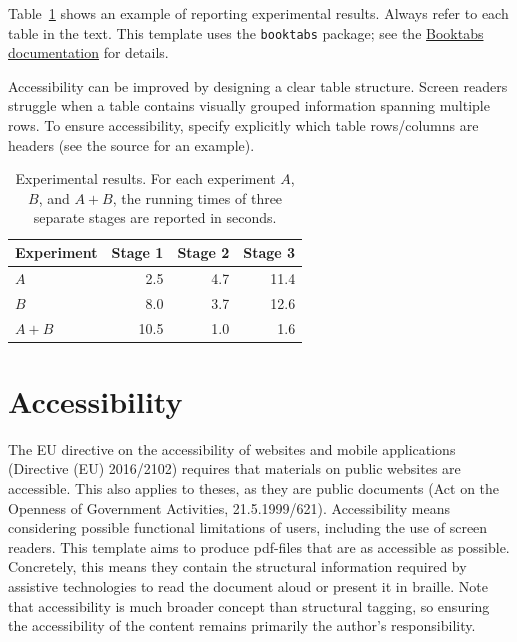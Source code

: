 \documentclass[english, manual, a4paper]{csthesis}
\begin{document}
Table~\ref{table:results-en} shows an example of reporting experimental results. Always refer to each table in the text. This template uses the \texttt{booktabs} package; see the \href{https://ctan.org/pkg/booktabs}{Booktabs documentation} for details.

Accessibility can be improved by designing a clear table structure. Screen readers struggle when a table contains visually grouped information spanning multiple rows. To ensure accessibility, specify explicitly which table rows/columns are headers (see the source for an example).

\begin{table}[b] %
\centering
\caption{Experimental results. For each experiment $A$, $B$, and $A+B$, the running times of three separate stages are reported in seconds. \label{table:results-en}}
\begin{tabular}{l r r r} \toprule
Experiment & Stage 1 & Stage 2 & Stage 3 \\ 
\midrule 
$A$ & 2.5 & 4.7 & 11.4 \\
$B$ & 8.0 & 3.7 & 12.6 \\
$A+B$ & 10.5 & 1.0 & 1.6 \\\bottomrule
\end{tabular}
\end{table}

\section{Accessibility}
\label{app:accessibility}

The EU directive on the accessibility of websites and mobile applications (Directive (EU) 2016/2102) requires that materials on public websites are accessible. This also applies to theses, as they are public documents (Act on the Openness of Government Activities, 21.5.1999/621). Accessibility means considering possible functional limitations of users, including the use of screen readers. This template aims to produce pdf-files that are as accessible as possible. Concretely, this means they contain the structural information required by assistive technologies to read the document aloud or present it in braille. Note that accessibility is much broader concept than structural tagging, so ensuring the accessibility of the content remains primarily the author's responsibility.
\end{document}
